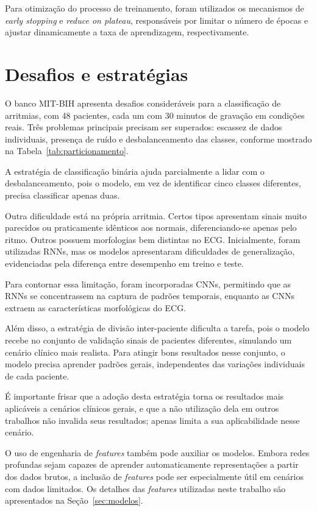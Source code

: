 \documentclass[
    12pt,                %
    openright,           %
    oneside,             %
    a4paper,             %
    brazil               %
]{abntex2}
\begin{document}
Para otimização do processo de treinamento, foram utilizados os mecanismos de \textit{early stopping} e \textit{reduce on plateau}, responsáveis por limitar o número de épocas e ajustar dinamicamente a taxa de aprendizagem, respectivamente.

\section{Desafios e estratégias}
\label{sec:desafios_estrategias}

O banco MIT-BIH apresenta desafios consideráveis para a classificação de arritmias, com 48 pacientes, cada um com 30 minutos de gravação em condições reais. Três problemas principais precisam ser superados: escassez de dados individuais, presença de ruído e desbalanceamento das classes, conforme mostrado na Tabela~\ref{tab:particionamento}.

A estratégia de classificação binária ajuda parcialmente a lidar com o desbalanceamento, pois o modelo, em vez de identificar cinco classes diferentes, precisa classificar apenas duas.

Outra dificuldade está na própria arritmia. Certos tipos apresentam sinais muito parecidos ou praticamente idênticos aos normais, diferenciando-se apenas pelo ritmo. Outros possuem morfologias bem distintas no ECG. Inicialmente, foram utilizadas RNNs, mas os modelos apresentaram dificuldades de generalização, evidenciadas pela diferença entre desempenho em treino e teste.

Para contornar essa limitação, foram incorporadas CNNs, permitindo que as RNNs se concentrassem na captura de padrões temporais, enquanto as CNNs extraem as características morfológicas do ECG.

Além disso, a estratégia de divisão inter-paciente dificulta a tarefa, pois o modelo recebe no conjunto de validação sinais de pacientes diferentes, simulando um cenário clínico mais realista. Para atingir bons resultados nesse conjunto, o modelo precisa aprender padrões gerais, independentes das variações individuais de cada paciente.

É importante frisar que a adoção desta estratégia torna os resultados mais aplicáveis a cenários clínicos gerais, e que a não utilização dela em outros trabalhos não invalida seus resultados; apenas limita a sua aplicabilidade nesse cenário.

O uso de engenharia de \textit{features} também pode auxiliar os modelos. Embora redes profundas sejam capazes de aprender automaticamente representações a partir dos dados brutos, a inclusão de \textit{features} pode ser especialmente útil em cenários com dados limitados. Os detalhes das \textit{features} utilizadas neste trabalho são apresentados na Seção~\ref{sec:modelos}.
\end{document}
